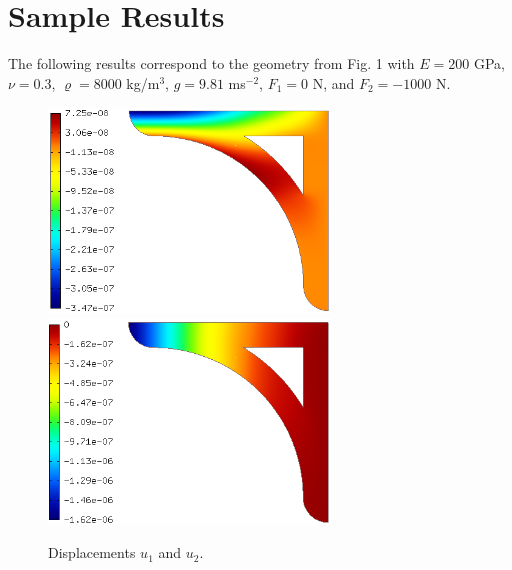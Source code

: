 \documentclass{article}
\begin{document}
\section{Sample Results}

The following results correspond to the geometry from Fig. 1 with 
$E = 200$ GPa, $\nu = 0.3$, $\varrho = 8000$ kg/m$^3$,
$g = 9.81$ ms$^{-2}$, $F_1 = 0$ N, and $F_2 = -1000$ N.

\newpage
\begin{figure}[!ht]
\begin{center}
\includegraphics[width=7.5cm]{img/result-1.png}\ \ \ \ \ \ 
\includegraphics[width=7.5cm]{img/result-2.png}
\caption{Displacements $u_1$ and $u_2$.}
\vspace{4mm}
\end{center}
\end{figure}
\end{document}

